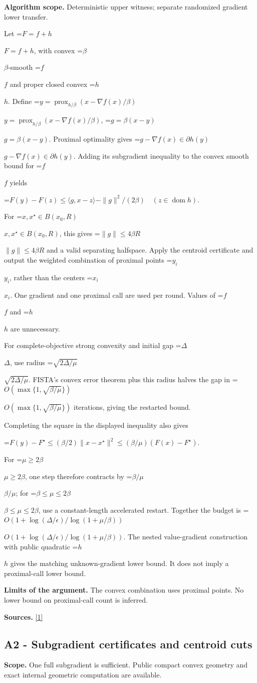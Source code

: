 \documentclass[10pt,a4paper]{article}
\newcommand{\AtlasMath}[1]{\par\begingroup\centering\setbox0=\hbox{$\displaystyle #1$}\ifdim\wd0>1.4\linewidth\typeout{ATLAS WIDE FORMULA: \the\wd0}\fi\ifdim\wd0>\linewidth\resizebox{\linewidth}{!}{\box0}\else\box0\fi\par\endgroup}
\newcommand{\AtlasInlineMath}[1]{\begingroup\setbox0=\hbox{$#1$}\ifdim\wd0>.4\linewidth\endgroup\AtlasMath{#1}\else\endgroup$#1$\fi}
\begin{document}
\textbf{Algorithm scope.} Deterministic upper witness; separate randomized gradient lower transfer.

Let \AtlasInlineMath{F=f+h}, with convex \AtlasInlineMath{\beta}-smooth \AtlasInlineMath{f} and proper closed convex \AtlasInlineMath{h}. Define
\AtlasInlineMath{y=\operatorname{prox}_{h/\beta}(x-\nabla f(x)/\beta)}, \AtlasInlineMath{g=\beta(x-y)}.
Proximal optimality gives \AtlasInlineMath{g-\nabla f(x)\in\partial h(y)}. Adding its subgradient inequality to the convex smooth bound for \AtlasInlineMath{f} yields

\AtlasMath{F(y)-F(z)\le\langle g,x-z\rangle-\|g\|^2/(2\beta)
\quad(z\in\operatorname{dom}h).}

For \AtlasInlineMath{x,x^\star\in B(x_0,R)}, this gives \AtlasInlineMath{\|g\|\le4\beta R} and a valid separating halfspace. Apply the centroid certificate and output the weighted combination of proximal points \AtlasInlineMath{y_i}, rather than the centers \AtlasInlineMath{x_i}. One gradient and one proximal call are used per round. Values of \AtlasInlineMath{f} and \AtlasInlineMath{h} are unnecessary.

For complete-objective strong convexity and initial gap \AtlasInlineMath{\Delta}, use radius \AtlasInlineMath{\sqrt{2\Delta/\mu}}. FISTA's convex error theorem plus this radius halves the gap in \AtlasInlineMath{O(\max\{1,\sqrt{\beta/\mu}\})} iterations, giving the restarted bound.

Completing the square in the displayed inequality also gives

\AtlasMath{F(y)-F^\star\le(\beta/2)\|x-x^\star\|^2
\le(\beta/\mu)(F(x)-F^\star).}

For \AtlasInlineMath{\mu\ge2\beta}, one step therefore contracts by \AtlasInlineMath{\beta/\mu}; for \AtlasInlineMath{\beta\le\mu\le2\beta}, use a constant-length accelerated restart. Together the budget is
\AtlasInlineMath{O(1+\log(\Delta/\epsilon)/\log(1+\mu/\beta))}.
The nested value-gradient construction with public quadratic \AtlasInlineMath{h} gives the matching unknown-gradient lower bound. It does not imply a proximal-call lower bound.

\textbf{Limits of the argument.} The convex combination uses proximal points. No lower bound on proximal-call count is inferred.

\textbf{Sources.} \href{https://www.tau.ac.il/~becka/FISTA.pdf}{[1]}

\subsection{A2 - Subgradient certificates and centroid cuts}
\textbf{Scope.} One full subgradient is sufficient. Public compact convex geometry and exact internal geometric computation are available.
\end{document}
